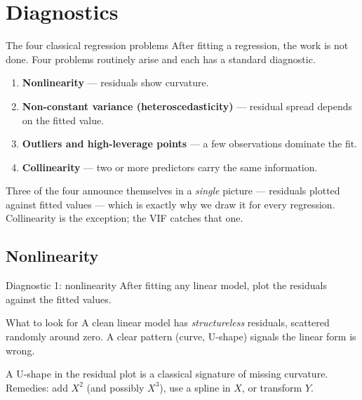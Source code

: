 \documentclass[aspectratio=169,11pt]{beamer}
\begin{document}
\section{Diagnostics}

\begin{frame}{The four classical regression problems}
  After fitting a regression, the work is not done. Four problems
  routinely arise and each has a standard diagnostic.
  \begin{enumerate}
    \item \textbf{Nonlinearity} --- residuals show curvature.
    \item \textbf{Non-constant variance (heteroscedasticity)} --- residual
          spread depends on the fitted value.
    \item \textbf{Outliers and high-leverage points} --- a few
          observations dominate the fit.
    \item \textbf{Collinearity} --- two or more predictors carry the
          same information.
  \end{enumerate}
  \begin{takeaway}
    Three of the four announce themselves in a \emph{single} picture ---
    residuals plotted against fitted values --- which is exactly why we
    draw it for every regression. Collinearity is the exception; the
    VIF catches that one.
  \end{takeaway}
\end{frame}

\subsection{Nonlinearity}

\begin{frame}{Diagnostic 1: nonlinearity}
  After fitting any linear model, plot the residuals against the
  fitted values.
  \begin{block}{What to look for}
    A clean linear model has \emph{structureless} residuals, scattered
    randomly around zero. A clear pattern (curve, U-shape) signals
    the linear form is wrong.
  \end{block}
  \begin{takeaway}
    A U-shape in the residual plot is a classical signature of missing
    curvature. Remedies: add $X^2$ (and possibly $X^3$), use a spline
    in $X$, or transform $Y$.
  \end{takeaway}
\end{frame}
\end{document}
